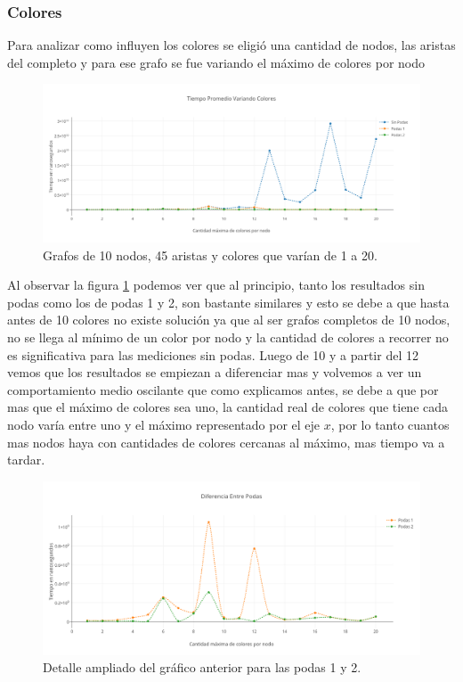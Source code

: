 \subsubsection{Colores}

 Para analizar como influyen los colores se eligió una cantidad de nodos, las aristas del completo y para ese grafo se fue variando el máximo de colores por nodo

 \begin{figure}[H]
	\centering
 	\includegraphics[scale=0.45]{imagenes/ej2/Colores.png}
	\caption{Grafos de 10 nodos, 45 aristas y colores que varían de 1 a 20.}
	\label{colores}
 \end{figure}

Al observar la figura \ref{colores} podemos ver que al principio, tanto los resultados sin podas como los de podas 1 y 2, son bastante similares y esto se debe a que hasta antes de 10 colores no existe solución ya que al ser grafos completos de 10 nodos, no se llega al mínimo de un color por nodo y la cantidad de colores a recorrer no es significativa para las mediciones sin podas. Luego de 10 y a partir del 12 vemos que los resultados se empiezan a diferenciar mas y volvemos a ver un comportamiento medio oscilante que como explicamos antes, se debe a que por mas que el máximo de colores sea uno, la cantidad real de colores que tiene cada nodo varía entre uno y el máximo representado por el eje $x$, por lo tanto cuantos mas nodos haya con cantidades de colores cercanas al máximo, mas tiempo va a tardar.

 \begin{figure}[H]
	\centering
 	\includegraphics[scale=0.45]{imagenes/ej2/ColoresPodas.png}
	\caption{Detalle ampliado del gráfico anterior para las podas 1 y 2.}
	\label{coloresP}
 \end{figure}

